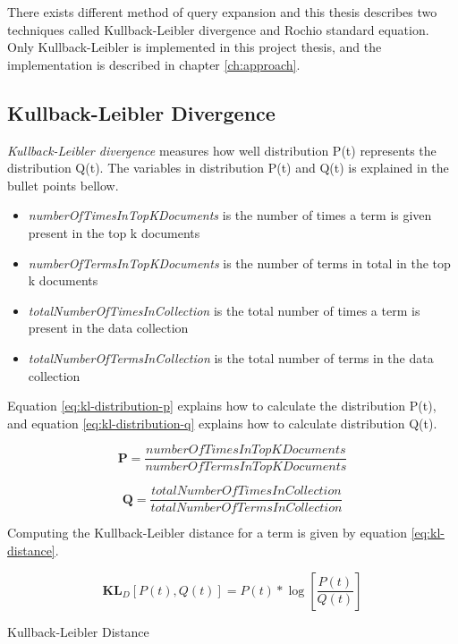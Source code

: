 There exists different method of query expansion and this thesis describes two techniques called Kullback-Leibler divergence and Rochio standard equation.
Only Kullback-Leibler is implemented in this project thesis, and the implementation is described in chapter \ref{ch:approach}.

\subsection{Kullback-Leibler Divergence}
\textit{Kullback-Leibler divergence} measures how well distribution P(t) represents the distribution Q(t).
The variables in distribution P(t) and Q(t) is explained in the bullet points bellow.

\begin{itemize}
	\item \textit{numberOfTimesInTopKDocuments} is the number of times a term is given present in the top k documents
	\item \textit{numberOfTermsInTopKDocuments} is the number of terms in total in the top k documents
	\item \textit{totalNumberOfTimesInCollection} is the total number of times a term is present in the data collection
	\item \textit{totalNumberOfTermsInCollection} is the total number of terms in the data collection
\end{itemize}

Equation \ref{eq:kl-distribution-p} explains how to calculate the distribution P(t),
and equation \ref{eq:kl-distribution-q} explains how to calculate distribution Q(t).

\begin{cequation}[H]
	\begin{equation}
		\mathbf{P} = \frac{numberOfTimesInTopKDocuments}{numberOfTermsInTopKDocuments}
	\end{equation}
	\caption{}
  \label{eq:kl-distribution-p}
\end{cequation}

\begin{cequation}[H]
	\begin{equation}
		\mathbf{Q} = \frac{totalNumberOfTimesInCollection}{totalNumberOfTermsInCollection}
	\end{equation}
	\caption{}
  \label{eq:kl-distribution-q}
\end{cequation}

Computing the Kullback-Leibler distance for a term is given by equation \ref{eq:kl-distance}.

\begin{cequation}[H]
	\begin{equation}
		\mathbf{KL}_D[P(t), Q(t)] = P(t)*\log{[\frac{P(t)}{Q(t)}]}
	\end{equation}
	\caption{Kullback-Leibler Distance}
  \label{eq:kl-distance}
\end{cequation}
